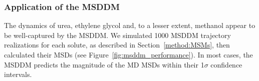 \documentclass[aps,pre,preprint,groupedaddress]{revtex4-2}
\begin{document}
  \subsubsection{Application of the MSDDM}\label{section:msddm_application}
  
  
  The dynamics of urea, ethylene glycol and, to a lesser extent, methanol appear
  to be well-captured by the MSDDM. We simulated 1000 MSDDM trajectory realizations
  for each solute, as described in Section~\ref{method:MSMs}, then calculated their
  MSDs (see Figure~\ref{fig:msddm_performance}). In most cases, the MSDDM predicts
  the magnitude of the MD MSDs within their 1$\sigma$ confidence intervals. 
  
  
\end{document}
